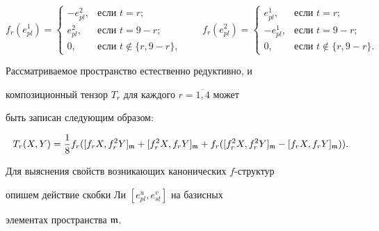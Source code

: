 \begin{equation}\label{f9}


f_r(e_{pl}^1)=\begin{cases}


-e_{pl}^2, & \text{если } t=r; \\


e_{pl}^2, & \text{если } t=9-r;\\


0, & \text{если } t\notin\{r,9-r\},


\end{cases}\qquad 


f_r(e_{pl}^2)=\begin{cases}


e_{pl}^1, & \text{если } t=r; \\


-e_{pl}^1, & \text{если } t=9-r; \\


0, & \text{если } t\notin\{r,9-r\}.


\end{cases}


\end{equation}





Рассматриваемое пространство естественно редуктивно, и


композиционный тензор $T_r$ для каждого $r=\overline{1,4}$ может


быть записан следующим образом:


\begin{equation}\label{T9}


T_r(X,Y)=\frac18 f_r([f_rX,f_r^2Y]_{\frak{m}} +


[f_r^2X,f_rY]_{\frak{m}} + f_r([f_r^2X,f_r^2Y]_{\frak{m}}


-[f_rX,f_rY]_{\frak{m}})).


\end{equation}








Для выяснения свойств возникающих канонических $f$-структур


опишем действие скобки Ли $[e^u_{pl},e^v_{st}]$ на базисных


элементах пространства $\frak{m}$.



